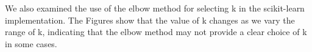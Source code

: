 \documentclass[12pt]{article}
\begin{document}
\begin{figure}[ht]
    \centering
        \xspace
\end{figure}
\newpage

We also examined the use of the elbow method for selecting k in the scikit-learn implementation. The Figures show that the value of k changes as we vary the range of k, indicating that the elbow method may not provide a clear choice of k in some cases.
\end{document}
